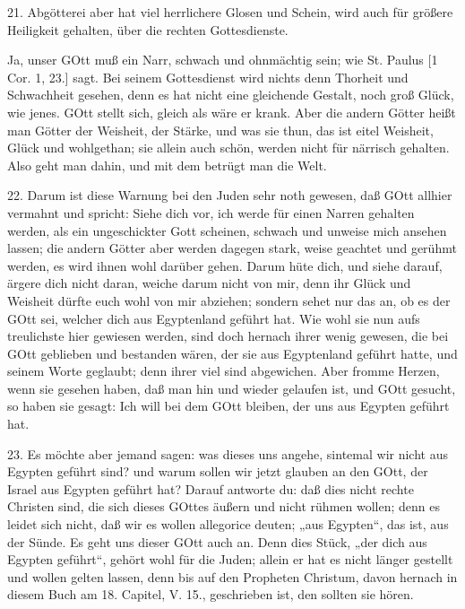 21. Abgötterei aber hat viel herrlichere Glosen und Schein, wird auch für größere Heiligkeit gehalten, über die rechten Gottesdienste.

Ja, unser GOtt muß ein Narr, schwach und ohnmächtig sein; wie St. Paulus [1 Cor. 1, 23.] sagt. Bei seinem Gottesdienst wird nichts denn Thorheit und Schwachheit gesehen, denn es hat nicht eine gleichende Gestalt, noch groß Glück, wie jenes. GOtt stellt sich, gleich als wäre er krank. Aber die andern Götter heißt man Götter der Weisheit, der Stärke, und was sie thun, das ist eitel Weisheit, Glück und wohlgethan; sie allein auch schön, werden nicht für närrisch gehalten. Also geht man dahin, und mit dem betrügt man die Welt.

22. Darum ist diese Warnung bei den Juden sehr noth gewesen, daß GOtt allhier vermahnt und spricht: Siehe dich vor, ich werde für einen Narren gehalten werden, als ein ungeschickter Gott scheinen, schwach und unweise mich ansehen lassen; die andern Götter aber werden dagegen stark, weise geachtet und gerühmt werden, es wird ihnen wohl darüber gehen. Darum hüte dich, und siehe darauf, ärgere dich nicht daran, weiche darum nicht von mir, denn ihr Glück und Weisheit dürfte euch wohl von mir abziehen; sondern sehet nur das an, ob es der GOtt sei, welcher dich aus Egyptenland geführt hat. Wie wohl sie nun aufs treulichste hier gewiesen werden, sind doch hernach ihrer wenig gewesen, die bei GOtt geblieben und bestanden wären, der sie aus Egyptenland geführt hatte, und seinem Worte geglaubt; denn ihrer viel sind abgewichen. Aber fromme Herzen, wenn sie gesehen haben, daß man hin und wieder gelaufen ist, und GOtt gesucht, so haben sie gesagt: Ich will bei dem GOtt bleiben, der uns aus Egypten geführt hat.

23. Es möchte aber jemand sagen: was dieses uns angehe, sintemal wir nicht aus Egypten geführt sind? und warum sollen wir jetzt glauben an den GOtt, der Israel aus Egypten geführt hat? Darauf antworte du: daß dies nicht rechte Christen sind, die sich dieses GOttes äußern und nicht rühmen wollen; denn es leidet sich nicht, daß wir es wollen allegorice deuten; „aus Egypten“, das ist, aus der Sünde. Es geht uns dieser GOtt auch an. Denn dies Stück, „der dich aus Egypten geführt“, gehört wohl für die Juden; allein er hat es nicht länger gestellt und wollen gelten lassen, denn bis auf den Propheten Christum, davon hernach in diesem Buch am 18. Capitel, V. 15., geschrieben ist, den sollten sie hören.

